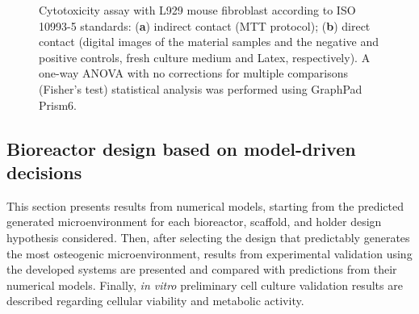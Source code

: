 \begin{figure}
\caption{{Cytotoxicity assay with L929 mouse fibroblast according to ISO 10993-5 standards: (\textbf{a}) indirect contact (MTT protocol); (\textbf{b}) direct contact (digital images of the material samples and the negative and positive controls, fresh culture medium and Latex, respectively). A one-way ANOVA with no corrections for multiple comparisons (Fisher’s test) statistical analysis was performed using GraphPad Prism6.}}
\label{figCito}
\end{figure}


\subsection{Bioreactor design based on model-driven decisions}
This section presents results from numerical models, starting from the predicted generated microenvironment for each bioreactor, scaffold, and holder design hypothesis considered. Then, after selecting the design that predictably generates the most osteogenic microenvironment, results from experimental validation using the developed systems are presented and compared with predictions from their numerical models. Finally, \textit{in vitro} preliminary cell culture validation results are described regarding cellular viability and metabolic activity. 


